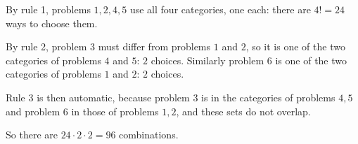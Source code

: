 By rule 1, problems $1,2,4,5$ use all four categories, one each: there are $4!=24$ ways to choose them.

By rule 2, problem $3$ must differ from problems $1$ and $2$, so it is one of the two categories of problems $4$ and $5$: $2$ choices. Similarly problem $6$ is one of the two categories of problems $1$ and $2$: $2$ choices.

Rule 3 is then automatic, because problem $3$ is in the categories of problems $4,5$ and problem $6$ in those of problems $1,2$, and these sets do not overlap.

So there are $24\cdot2\cdot2=\boxed{96}$ combinations.
